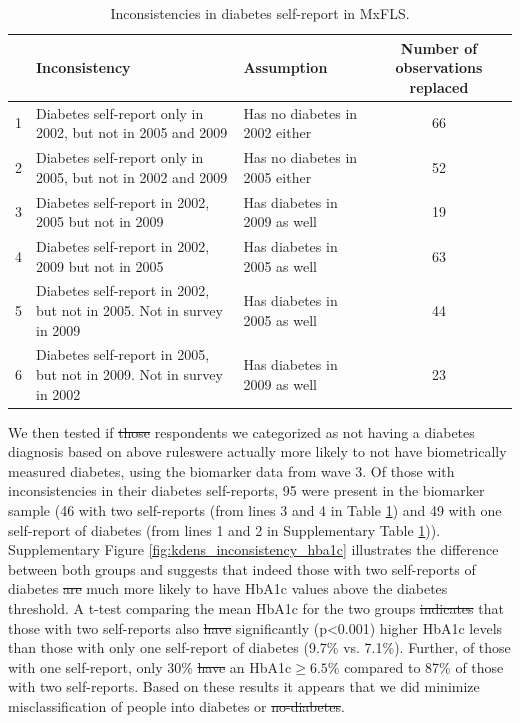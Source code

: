 \documentclass[12pt,english]{article}
\providecommand{\tabularnewline}{\\}
\providecommand{\DIFaddtex}[1]{{\protect\color{blue}\uwave{#1}}} %
\providecommand{\DIFdeltex}[1]{{\protect\color{red}\sout{#1}}}                      %
\providecommand{\DIFaddbegin}{} %
\providecommand{\DIFaddend}{} %
\providecommand{\DIFdelbegin}{} %
\providecommand{\DIFdelend}{} %
\providecommand{\DIFadd}[1]{\texorpdfstring{\DIFaddtex{#1}}{#1}} %
\providecommand{\DIFdel}[1]{\texorpdfstring{\DIFdeltex{#1}}{}} %
\begin{document}
\begin{table}[!ht]
	\caption{\label{tab:Inconsistencies}Inconsistencies in diabetes self-report in MxFLS.}
	\begin{center}
		\begin{adjustbox}{max width=\linewidth} 
			\begin{tabular}{lllc}
				\hline 
				&Inconsistency  & Assumption  & Number of observations replaced\tabularnewline
				\hline 
				1 &Diabetes self-report only in 2002, but not in 2005 and 2009  & Has no diabetes in 2002 either  & 66\tabularnewline
				2 &Diabetes self-report only in 2005, but not in 2002 and 2009  & Has no diabetes in 2005 either  & 52\tabularnewline
				3 &Diabetes self-report in 2002, 2005 but not in 2009  & Has diabetes in 2009 as well  & 19\tabularnewline
				4 &Diabetes self-report in 2002, 2009 but not in 2005  & Has diabetes in 2005 as well  & 63\tabularnewline
				5 &Diabetes self-report in 2002, but not in 2005. Not in survey in 2009  & Has diabetes in 2005 as well  & 44\tabularnewline
				6 &Diabetes self-report in 2005, but not in 2009. Not in survey in 2002  & Has diabetes in 2009 as well  & 23\tabularnewline
				\hline 
			\end{tabular}
		\end{adjustbox}
	\end{center}
\end{table}

We then tested if \DIFdelbegin \DIFdel{those }\DIFdelend \DIFaddbegin \DIFadd{the }\DIFaddend respondents we categorized as not having a diabetes diagnosis based on above rules\DIFaddbegin \DIFadd{, }\DIFaddend were actually more likely to not have biometrically measured diabetes, using the biomarker data from wave 3. Of those with inconsistencies in their diabetes self-reports, 95 were present in the biomarker sample (46 with two self-reports (from lines 3 and 4 in Table \ref{tab:Inconsistencies}) and 49 with one self-report of diabetes (from lines 1 and 2 in Supplementary Table \ref{tab:Inconsistencies})). Supplementary Figure \ref{fig:kdens_inconsistency_hba1c} illustrates the difference between both groups and suggests that indeed those with two self-reports of diabetes \DIFdelbegin \DIFdel{are }\DIFdelend \DIFaddbegin \DIFadd{were }\DIFaddend much more likely to have \ac{HbA1c} values above the diabetes threshold. A t-test comparing the mean \ac{HbA1c} for the two groups \DIFdelbegin \DIFdel{indicates }\DIFdelend \DIFaddbegin \DIFadd{indicated }\DIFaddend that those with two self-reports also \DIFdelbegin \DIFdel{have }\DIFdelend \DIFaddbegin \DIFadd{had }\DIFaddend significantly (p<0.001) higher \ac{HbA1c} levels than those with only one self-report of diabetes (9.7\% vs. 7.1\%). Further, of those with one self-report,  only 30\% \DIFdelbegin \DIFdel{have }\DIFdelend \DIFaddbegin \DIFadd{had }\DIFaddend an \ac{HbA1c}$\geq6.5$\% compared to 87\% of those with two self-reports. Based on these results it appears that we did minimize misclassification of people into diabetes or \DIFdelbegin \DIFdel{no-diabetes}\DIFdelend \DIFaddbegin \DIFadd{no diabetes}\DIFaddend . 
\end{document}
